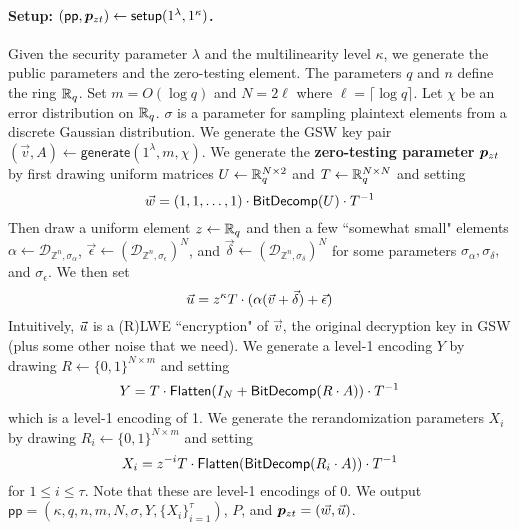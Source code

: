 \paragraph{Setup: $(\mathsf{pp},\bm{p}_{zt}) \leftarrow \mathsf{setup}(1^\lambda, 1^\kappa)$.}  Given the security parameter $\lambda$ and the multilinearity level $\kappa$, we generate the public parameters and the zero-testing element.  The parameters $q$ and $n$ define the ring $\mathbb{R}_q$.  Set $m = O(\log q)$ and $N = 2\ell$ where $\ell = \lceil \log q \rceil$.  Let $\chi$ be an error distribution on $\mathbb{R}_q$.  $\sigma$ is a parameter for sampling plaintext elements from a discrete Gaussian distribution.  We generate the GSW key pair $(\vec{v},A) \leftarrow\mathsf{generate}(1^\lambda,m, \chi)$.  We generate the {\bf zero-testing parameter} $\bm{p}_{zt}$ by first drawing uniform matrices $U \leftarrow \mathbb{R}_q^{N\times 2}$ and $T \leftarrow \mathbb{R}_q^{N \times N}$ and setting $$\vec{w} = (1,1,\ldots,1)\cdot \mathsf{BitDecomp}(U)\cdot T^{-1}$$  Then draw a uniform element $z \leftarrow \mathbb{R}_q$ and then a few ``somewhat small" elements $\alpha \leftarrow \mathcal{D}_{\mathbb{Z}^n, \sigma_\alpha}$, $\vec{\epsilon} \leftarrow (\mathcal{D}_{\mathbb{Z}^n, \sigma_\epsilon})^N$, and $\vec{\delta} \leftarrow (\mathcal{D}_{\mathbb{Z}^n, \sigma_\delta})^N$ for some parameters $\sigma_\alpha, \sigma_\delta,$ and $\sigma_\epsilon$.  We then set $$\vec{u} = z^\kappa T\cdot (\alpha(\vec{v} + \vec{\delta}) + \vec{\epsilon})$$  Intuitively, $\vec{u}$ is a (R)LWE ``encryption" of $\vec{v}$, the original decryption key in GSW (plus some other noise that we need).  We generate a level-1 encoding $Y$ by drawing $R \leftarrow \{0,1\}^{N\times m}$ and setting $$Y = T\cdot\mathsf{Flatten}(I_N + \mathsf{BitDecomp}(R\cdot A))\cdot T^{-1}$$  which is a level-1 encoding of 1. We generate the rerandomization parameters $X_i$ by drawing $R_i \leftarrow \{0,1\}^{N \times m}$ and setting $$X_i = z^{-i}T\cdot\mathsf{Flatten}(\mathsf{BitDecomp}(R_i\cdot A))\cdot T^{-1}$$ for $1 \leq i \leq \tau$.  Note that these are level-1 encodings of 0. We output $\mathsf{pp} = (\kappa, q,n,m,N,\sigma, Y, \{X_i\}_{i=1}^\tau)$, $P$, and $\bm{p}_{zt} = (\vec{w},\vec{u})$.

